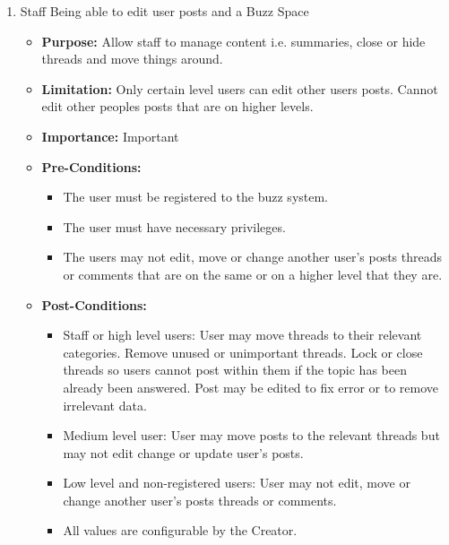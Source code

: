 \documentclass[11pt]{article}
\begin{document}
\begin{enumerate}
\begin{itemize}
\end{itemize}			

 \newpage

\item Staff Being able to edit user posts and a Buzz Space
\begin{itemize}	
	\item 
	\textbf{Purpose: }Allow staff to manage content i.e. summaries, close or hide threads and move things around.
	\item\textbf{Limitation: }Only certain level users can edit other users posts.
	 Cannot edit other peoples posts that are on higher levels.
	\item\textbf{Importance:} Important
		

	\item\textbf{Pre-Conditions: }
	\begin{itemize}
		\item The user must be registered to the buzz system.
		\item The user must have necessary privileges.
		\item The users may not edit, move or change another user’s posts threads or comments that are on the same or on a higher level that they are.
	\end{itemize}
	
	\item\textbf{Post-Conditions: }
	\begin{itemize}
		\item Staff or high level users:
		User may move threads to their relevant categories. Remove unused or unimportant threads. Lock or close threads so users cannot post within them if the topic has been already been answered. Post may be edited to fix error or to remove irrelevant data.
		\item Medium level user:
		User may move posts to the relevant threads but may not edit change or update user’s posts.
		\item Low level and non-registered users:
		User may not edit, move or change another user’s posts threads or comments.
	 	\item All values are configurable by the Creator.
	\end{itemize}


\end{itemize}
\end{enumerate}
\end{document}

